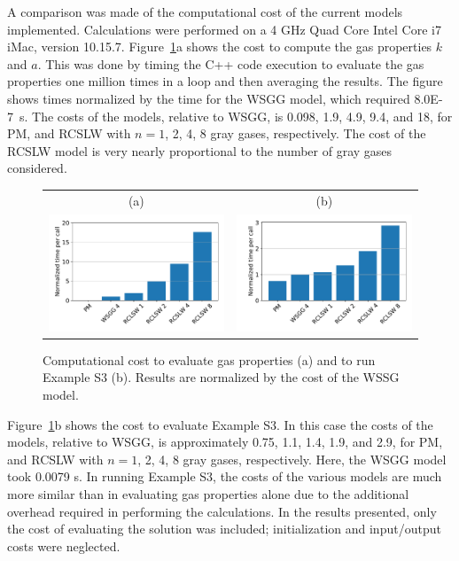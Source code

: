 \documentclass[preprint,12pt, a4paper]{elsarticle}
\begin{document}
A comparison was made of the computational cost of the current models implemented. Calculations were performed on a 4 GHz Quad Core Intel Core i7 iMac, version 10.15.7. Figure~\ref{f:cost}a shows the cost to compute the gas properties $k$ and $a$. This was done by timing the C++ code execution to evaluate the gas properties one million times in a loop and then averaging the results. The figure shows times normalized by the time for the WSGG model, which required 8.0E-7~s. The costs of the models, relative to WSGG, is 0.098, 1.9, 4.9, 9.4, and 18, for PM, and RCSLW with $n=1$, 2, 4, 8 gray gases, respectively. The cost of the RCSLW model is very nearly proportional to the number of gray gases considered.
%
\begin{figure}
    \begin{center}
    \begin{tabular}{c c}
        (a) & (b) \\
        \includegraphics[width=2.75 in]{fig_getka_c++.pdf} &
        \includegraphics[width=2.75 in]{fig_exS3_c++.pdf}
    \end{tabular}
    \caption{Computational cost to evaluate gas properties (a) and to run Example S3 (b). Results are normalized by the cost of the WSSG model.}
    \label{f:cost}
    \end{center}
\end{figure}
%

Figure~\ref{f:cost}b shows the cost to evaluate Example S3. 
In this case the costs of the models, relative to WSGG, is approximately 0.75, 1.1, 1.4, 1.9, and 2.9, for PM, and RCSLW with $n=1$, 2, 4, 8 gray gases, respectively. Here, the WSGG model took 0.0079 s. In running Example S3, the costs of the various models are much more similar than in evaluating gas properties alone due to the additional overhead required in performing the calculations. In the results presented, only the cost of evaluating the solution was included; initialization and input/output costs were neglected.
\end{document}

